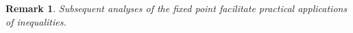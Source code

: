 \documentclass{article}
\newtheorem*{remark}{Remark}
\begin{document}
\begin{remark}
    Subsequent analyses of the fixed point facilitate practical applications of inequalities.
\end{remark}
\end{document}

